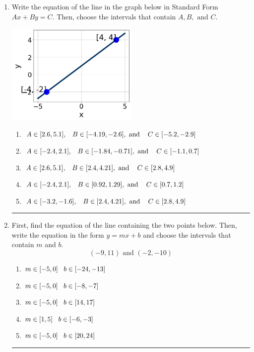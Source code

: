 \documentclass[14pt]{extbook}
\newcommand{\litem}[1]{\item#1\hspace*{-1cm}\rule{\textwidth}{0.4pt}}
\begin{document}
\begin{enumerate}
{\begin{enumerate}[label=\Alph*.]
\end{enumerate} }
\litem{
Write the equation of the line in the graph below in Standard Form $Ax+By=C$. Then, choose the intervals that contain $A, B, \text{ and } C$.
\begin{center}
    \includegraphics[width=0.5\textwidth]{../Figures/linearGraphToStandardC.png}
\end{center}
\begin{enumerate}[label=\Alph*.]
\item \( A \in [2.6, 5.1], \hspace{3mm} B \in [-4.19, -2.6], \text{ and } \hspace{3mm} C \in [-5.2, -2.9] \)
\item \( A \in [-2.4, 2.1], \hspace{3mm} B \in [-1.84, -0.71], \text{ and } \hspace{3mm} C \in [-1.1, 0.7] \)
\item \( A \in [2.6, 5.1], \hspace{3mm} B \in [2.4, 4.21], \text{ and } \hspace{3mm} C \in [2.8, 4.9] \)
\item \( A \in [-2.4, 2.1], \hspace{3mm} B \in [0.92, 1.29], \text{ and } \hspace{3mm} C \in [0.7, 1.2] \)
\item \( A \in [-3.2, -1.6], \hspace{3mm} B \in [2.4, 4.21], \text{ and } \hspace{3mm} C \in [2.8, 4.9] \)

\end{enumerate} }
\litem{
First, find the equation of the line containing the two points below. Then, write the equation in the form $ y=mx+b $ and choose the intervals that contain $m$ and $b$.\[ (-9, 11) \text{ and } (-2, -10) \]\begin{enumerate}[label=\Alph*.]
\item \( m \in [-5, 0] \hspace*{3mm} b \in [-24, -13] \)
\item \( m \in [-5, 0] \hspace*{3mm} b \in [-8, -7] \)
\item \( m \in [-5, 0] \hspace*{3mm} b \in [14, 17] \)
\item \( m \in [1, 5] \hspace*{3mm} b \in [-6, -3] \)
\item \( m \in [-5, 0] \hspace*{3mm} b \in [20, 24] \)


\end{enumerate}}
\end{enumerate}
\end{document}
